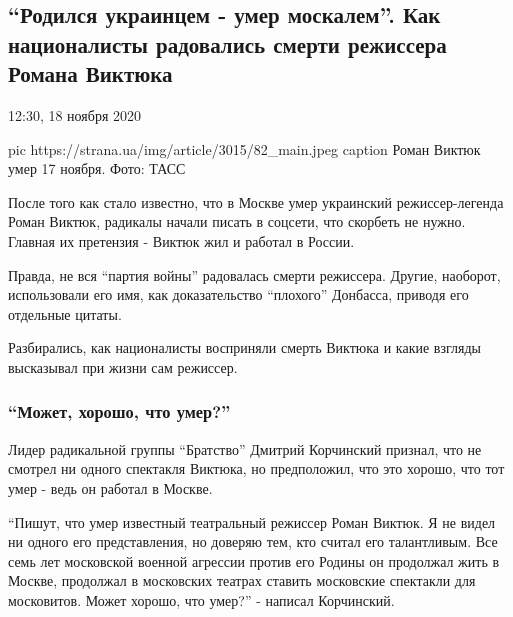  
 
 

\subsection{\enquote{Родился украинцем - умер москалем}. Как националисты радовались смерти режиссера Романа Виктюка}
\label{sec:18_11_2020.news.ua.strana.3.roman_viktjuk}

12:30, 18 ноября 2020 

\ifcmt
pic https://strana.ua/img/article/3015/82_main.jpeg
caption Роман Виктюк умер 17 ноября. Фото: ТАСС 
\fi
 

После того как стало известно, что в Москве умер украинский
режиссер-легенда Роман Виктюк, радикалы начали писать в соцсети, что
скорбеть не нужно. Главная их претензия - Виктюк жил и работал в России. 

Правда, не вся \enquote{партия войны} радовалась смерти режиссера. Другие,
наоборот, использовали его имя, как доказательство \enquote{плохого} Донбасса,
приводя его отдельные цитаты.

Разбирались, как националисты восприняли смерть Виктюка и какие взгляды
высказывал при жизни сам режиссер.

\subsubsection{\enquote{Может, хорошо, что умер?}}

Лидер радикальной группы \enquote{Братство} Дмитрий Корчинский признал, что не
смотрел ни одного спектакля Виктюка, но предположил, что это хорошо, что
тот умер - ведь он работал в Москве.

\enquote{Пишут, что умер известный театральный режиссер Роман Виктюк. Я не видел
ни одного его представления, но доверяю тем, кто считал его талантливым.
Все семь лет московской военной агрессии против его Родины он продолжал
жить в Москве, продолжал в московских театрах ставить московские спектакли
для московитов. Может хорошо, что умер?} - написал Корчинский.

